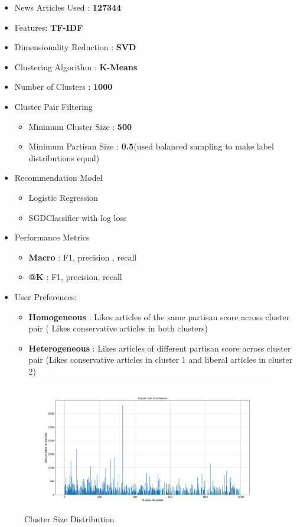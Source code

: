 \documentclass[a4paper,fontsize=8.0pt]{scrartcl}
\begin{document}
\begin{flushleft}
\begin{itemize}
  \item News Articles Used : \textbf{127344}
  \item Features: \textbf{TF-IDF}
  \item Dimensionality Reduction : \textbf{SVD}
  \item Clustering Algorithm : \textbf{K-Means}
  \item Number of Clusters : \textbf{1000}
  \item Cluster Pair Filtering 
  \begin{itemize}
      \item Minimum Cluster Size : \textbf{500}
      \item Minimum Partisan Size : \textbf{0.5}(used balanced sampling to make label distributions equal)
  \end{itemize}
  \item Recommendation Model
  \begin{itemize}
      \item Logistic Regression
      \item SGDClassifier with log loss
  \end{itemize}
  \item Performance Metrics
  \begin{itemize}
      \item \textbf{Macro} : F1, precision , recall
      \item \textbf{@K} : F1, precision, recall
  \end{itemize}
  \item User Preferences:
  \begin{itemize}
      \item \textbf{Homogeneous} : Likes articles of the same partisan score across cluster pair ( Likes conservative articles in both clusters)
      \item \textbf{Heterogeneous} : Likes articles of different partisan score across cluster pair (Likes conservative articles in cluster 1 and liberal articles in cluster 2)
  \end{itemize}
\end{itemize}
\begin{figure}[H]
 \centering
 \includegraphics[width=1.0\textwidth]{Graphs/cluster_size_dist.pdf}
 \caption{Cluster Size Distribution}
\end{figure}
\end{flushleft}
\end{document}
